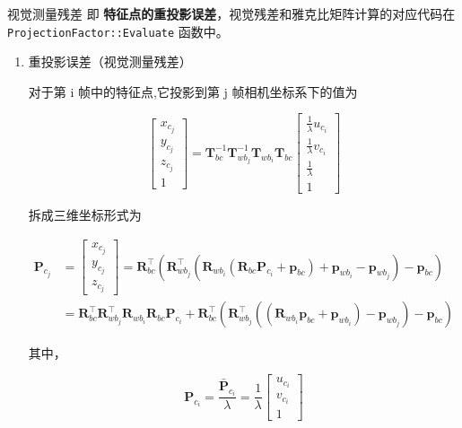 \documentclass[12pt,a4paper]{article}
\begin{document}
视觉测量残差 即 \textbf{特征点的重投影误差}，视觉残差和雅克比矩阵计算的对应代码在\verb|ProjectionFactor::Evaluate| 函数中。

\begin{enumerate}

\item 重投影误差（视觉测量残差）

对于第 i 帧中的特征点,它投影到第 j 帧相机坐标系下的值为

\begin{equation}
\left[\begin{array}{c}
{x_{c_{j}}} \\ {y_{c_{j}}} \\ {z_{c_{j}}} \\ {1}
\end{array}\right] =
\mathbf{T}_{b c}^{-1} 
\mathbf{T}_{w b_{j}}^{-1} 
\mathbf{T}_{w b_{i}} 
\mathbf{T}_{b c}
\left[\begin{array}{c}
{\frac{1}{\lambda} u_{c_{i}}} \\ 
{\frac{1}{\lambda} v_{c_{i}}} \\ 
{\frac{1}{\lambda}} \\ 
{1}
\end{array}\right]
\end{equation}

拆成三维坐标形式为

\begin{equation}
\label{equ:pcj}
\begin{aligned} 
\mathbf{P}_{c_{j}} 
&=
\left[\begin{array}{c}
{x_{c_{j}}} \\ {y_{c_{j}}} \\ {z_{c_{j}}}
\end{array}\right] 
=
\mathbf{R}_{b c}^{\top} \left(
\mathbf{R}_{w b_{j}}^{\top} \left(
\mathbf{R}_{w b_{i}} \left(
\mathbf{R}_{b c} 
\mathbf{P}_{c_i}
+ \mathbf{p}_{b c} \right)
+ \mathbf{p}_{w b_{i}} - \mathbf{p}_{w b_{j}}\right)
- \mathbf{p}_{b c}\right) \\
&=
\mathbf{R}_{b c}^{\top} 
\mathbf{R}_{w b_{j}}^{\top} 
\mathbf{R}_{w b_{i}} 
\mathbf{R}_{b c} 
\mathbf{P}_{c_i} +
\mathbf{R}_{b c}^{\top}
\left(\mathbf{R}_{w b_{j}}^{\top} 
\left(\left(\mathbf{R}_{w b_{i}} \mathbf{p}_{b c}+\mathbf{p}_{w b_{i}}\right)
-\mathbf{p}_{w b_{j}}\right)-\mathbf{p}_{b c}\right) 
\end{aligned}
\end{equation}

其中，

\begin{equation}
\label{equ:pci}
\mathbf{P}_{c_i} = \frac{\bar{\mathbf{P}}_{c_{i}}}{\lambda} = 
\frac{1}{\lambda}
\left[\begin{array}{c}
{u_{c_{i}}} \\ {v_{c_{i}}} \\ {1}
\end{array}\right]
\end{equation}


\end{enumerate}
\end{document}
